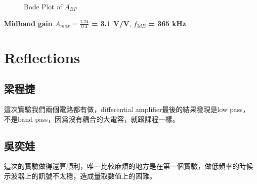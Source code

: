 \documentclass{article}
\begin{document}
\begin{CJK*}{UTF8}{bkai}
\begin{minipage}{0.5\textwidth}
\begin{figure}[H]
        \caption{Bode Plot of $A_{BP}$}
    \end{figure}
\end{minipage}
\vspace{3mm}
\textbf{Midband gain $A_{max} = \frac{1.24}{0.4}$ = 3.1 V/V}, \textbf{$f_{3dB}$ = 365 \unit{\kilo\hertz}}

\section*{Reflections}
\subsection*{梁程捷}
這次實驗我們兩個電路都有做，differential amplifier最後的結果發現是low pass，不是band pass，因爲沒有耦合的大電容，就跟課程一樣。
\subsection*{吳奕娃}
這次的實驗做得還算順利，唯一比較麻煩的地方是在第一個實驗，做低頻率的時候示波器上的訊號不太穩，造成量取數值上的困難。
\end{CJK*}
\end{document}
